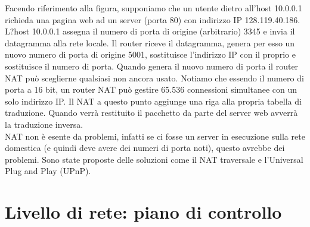 \documentclass[11pt,a4paper]{article}
\begin{document}
Facendo riferimento alla figura, supponiamo che un utente dietro all'host 10.0.0.1 richieda una pagina web ad un server (porta 80) con indirizzo IP 128.119.40.186. L?host 10.0.0.1 assegna il numero di porta di origine (arbitrario) 3345 e invia il datagramma alla rete locale. Il router riceve il datagramma, genera per esso un nuovo numero di porta di origine 5001, sostituisce l'indirizzo IP con il proprio e sostituisce il numero di porta. Quando genera il nuovo numero di porta il router NAT può sceglierne qualsiasi non ancora usato. Notiamo che essendo il numero di porta a 16 bit, un router NAT può gestire 65.536 connessioni simultanee con un solo indirizzo IP. Il NAT a questo punto aggiunge una riga alla propria tabella di traduzione. Quando verrà restituito il pacchetto da parte del server web avverrà la traduzione inversa. \\
NAT non è esente da problemi, infatti se ci fosse un server in esecuzione sulla rete domestica (e quindi deve avere dei numeri di porta noti), questo avrebbe dei problemi. Sono state proposte delle soluzioni come il NAT traversale e l'Universal Plug and Play (UPnP).

\section{Livello di rete: piano di controllo}
\end{document}
